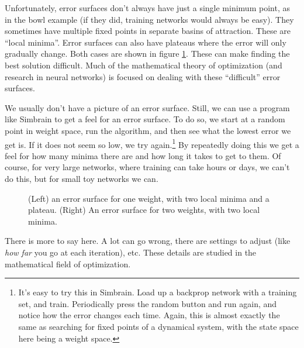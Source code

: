 Unfortunately, error surfaces don't always have just a single minimum point, as in the bowl example (if they did, training networks would always be easy). They sometimes have multiple fixed points in separate basins of attraction. These are ``local minima''. Error surfaces can also have plateaus where the error will only gradually change. Both cases are shown in figure \ref{local_minima}. These can make finding the best solution difficult. Much of the mathematical theory of optimization (and  research in neural networks) is focused on dealing with these ``difficult'' error surfaces.

We usually don't have a picture of an error surface. Still, we can use a program like Simbrain to get a feel for an error surface. To do so, we start at a random point in weight space, run the algorithm, and then see what the lowest error we get is. If it does not seem so low, we try again.\footnote{It's easy to try this in Simbrain. Load up a backprop network with a training set, and train. Periodically press the random button and run again, and notice how the error changes each time. Again, this is almost exactly the same as searching for fixed points of a dynamical system,  with the state space here being a weight space.} By repeatedly doing this we get a feel for how many minima there are and how long it takes to get to them. Of course, for very  large networks, where training can take hours or days, we can't do this, but for small toy networks we can.

\begin{figure}[h]
\centering
{}
\caption[Jeff Yoshimi and Scott Hotton.]{(Left) an error surface for one weight, with two local minima and a plateau. (Right) An error surface for two weights, with two local minima.}
\label{local_minima}
\end{figure}

 There is more to say here. A lot can go wrong, there are settings to adjust (like \emph{how far} you go at each iteration), etc. These details are studied in the mathematical field of optimization.

